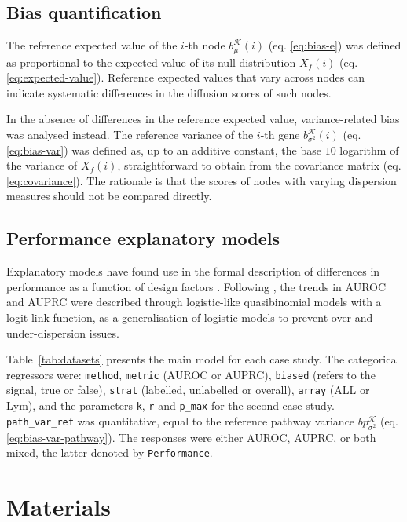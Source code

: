 \documentclass[final]{bioinfo}
\newcommand{\ebias}{b_{\mu}^{\mathcal{K}}}
\newcommand{\vbias}{b_{\sigma^2}^{\mathcal{K}}}
\newcommand{\pbias}{bp_{\sigma^2}^{\mathcal{K}}}
\newcommand{\Rcode}{\texttt}
\begin{document}
\begin{methods}
\subsection*{Bias quantification}

The reference expected value of the $i$-th node $\ebias(i)$ (eq. \ref{eq:bias-e}) was defined as proportional to the expected value of its null distribution $X_f(i)$ (eq. \ref{eq:expected-value}).
Reference expected values that vary across nodes can indicate systematic differences in the diffusion scores of such nodes. 

In the absence of differences in the reference expected value, variance-related bias was analysed instead.
The reference variance of the $i$-th gene $\vbias(i)$ (eq. \ref{eq:bias-var}) was defined as, up to an additive constant, the base $10$ logarithm of the variance of $X_f(i)$, straightforward to obtain from the covariance matrix (eq. \ref{eq:covariance}). 
The rationale is that the scores of nodes with varying dispersion measures should not be compared directly.

\subsection*{Performance explanatory models}

Explanatory models have found use in the formal description of differences in performance as a function of design factors \citep{lopez2019evaluation,picart2019benchmarking}.
Following \citep{picart2019benchmarking}, the trends in AUROC and AUPRC were described through logistic-like quasibinomial models with a logit link function, as a generalisation of logistic models to prevent over and under-dispersion issues.

Table~\ref{tab:datasets} presents the main model for each case study. 
The categorical regressors were: \Rcode{method}, \Rcode{metric} (AUROC or AUPRC), \Rcode{biased} (refers to the signal, true or false), \Rcode{strat} (labelled, unlabelled or overall), \Rcode{array} (ALL or Lym), and the parameters \Rcode{k}, \Rcode{r} and \Rcode{p\_max} for the second case study. 
\Rcode{path\_var\_ref} was quantitative, equal to the reference pathway variance $\pbias$ (eq. \ref{eq:bias-var-pathway}). 
The responses were either AUROC, AUPRC, or both mixed, the latter denoted by \Rcode{Performance}.

\section*{Materials}


\end{methods}
\end{document}
